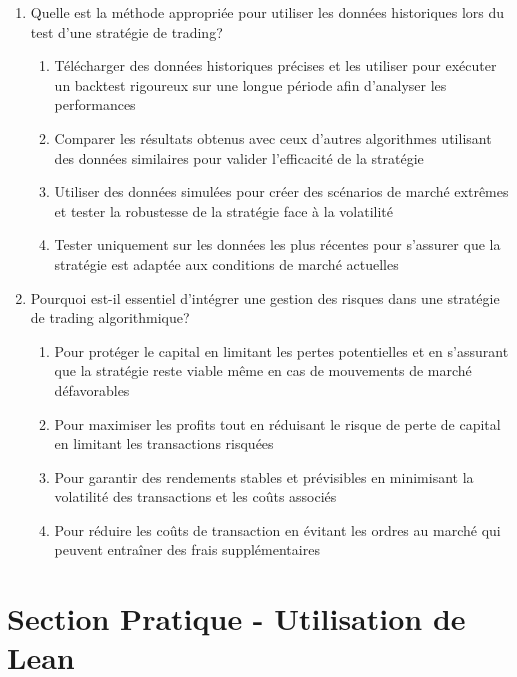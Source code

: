 \documentclass[a4paper,12pt]{article}
\begin{document}
\begin{enumerate}
    \item Quelle est la méthode appropriée pour utiliser les données historiques lors du test d'une stratégie de trading?
    \begin{enumerate}[label=(\Alph*)]
        \item Télécharger des données historiques précises et les utiliser pour exécuter un backtest rigoureux sur une longue période afin d'analyser les performances
        \item Comparer les résultats obtenus avec ceux d'autres algorithmes utilisant des données similaires pour valider l'efficacité de la stratégie
        \item Utiliser des données simulées pour créer des scénarios de marché extrêmes et tester la robustesse de la stratégie face à la volatilité
        \item Tester uniquement sur les données les plus récentes pour s'assurer que la stratégie est adaptée aux conditions de marché actuelles
    \end{enumerate}

    \item Pourquoi est-il essentiel d'intégrer une gestion des risques dans une stratégie de trading algorithmique?
    \begin{enumerate}[label=(\Alph*)]
        \item Pour protéger le capital en limitant les pertes potentielles et en s'assurant que la stratégie reste viable même en cas de mouvements de marché défavorables
        \item Pour maximiser les profits tout en réduisant le risque de perte de capital en limitant les transactions risquées
        \item Pour garantir des rendements stables et prévisibles en minimisant la volatilité des transactions et les coûts associés
        \item Pour réduire les coûts de transaction en évitant les ordres au marché qui peuvent entraîner des frais supplémentaires
    \end{enumerate}

\end{enumerate}

\newpage

\section*{Section Pratique - Utilisation de Lean}
\end{document}
